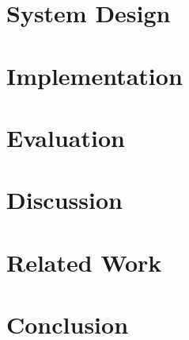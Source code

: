 \documentclass[letterpaper,twocolumn,10pt]{article}
\begin{document}
\section{System Design}
\label{sec:design}

 
\section{Implementation}
\label{sec:impl}

 
\section{Evaluation}
\label{sec:eval}

 
\section{Discussion}
\label{sec:discussion}

 
\section{Related Work}
\label{sec:related}

 
\section{Conclusion}
\label{sec:conclusion}

 

\nocite{hu2024degpt,chen2022dirty}



\end{document}

